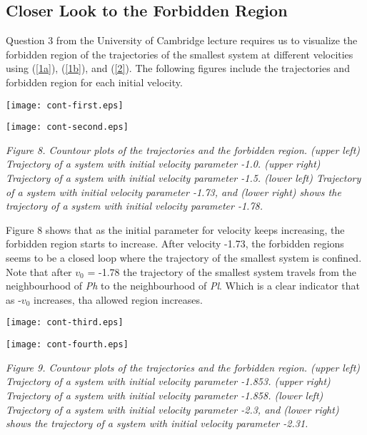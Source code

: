 \documentclass{article}
\begin{document}
\subsection{Closer Look to the Forbidden Region}

Question 3 from the University of Cambridge lecture requires us to visualize the forbidden region of the trajectories of the smallest system at different velocities using (\ref{1a}), (\ref{1b}), and (\ref{2}). The following figures include the trajectories and forbidden region for each initial velocity.

\begin{center}
  \texttt{[image: cont-first.eps]}
\end{center}
\begin{center}
  \texttt{[image: cont-second.eps]}
\end{center}

\begin{center}
   \textit{Figure 8. Countour plots of the trajectories and the forbidden region. (upper left) Trajectory of a system with initial velocity parameter -1.0. (upper right) Trajectory of a system with initial velocity parameter -1.5. (lower left) Trajectory of a system with initial velocity parameter -1.73, and (lower right) shows the trajectory of a system with initial velocity parameter -1.78.}
\end{center}

Figure 8 shows that as the initial parameter for velocity keeps increasing, the forbidden region starts to increase. After velocity -1.73, the forbidden regions seems to be a closed loop where the trajectory of the smallest system is confined. Note that after \textit{$v_0$} = -1.78 the trajectory of the smallest system travels from the neighbourhood of \textit{Ph} to the neighbourhood of \textit{Pl}. Which is a clear indicator that as -\textit{$v_0$} increases, tha allowed region increases.

\newpage

\begin{center}
  \texttt{[image: cont-third.eps]}
\end{center}
\begin{center}
  \texttt{[image: cont-fourth.eps]}
\end{center}

\begin{center}
   \textit{Figure 9. Countour plots of the trajectories and the forbidden region. (upper left) Trajectory of a system with initial velocity parameter -1.853. (upper right) Trajectory of a system with initial velocity parameter -1.858. (lower left) Trajectory of a system with initial velocity parameter -2.3, and (lower right) shows the trajectory of a system with initial velocity parameter -2.31.}
\end{center}
\end{document}
